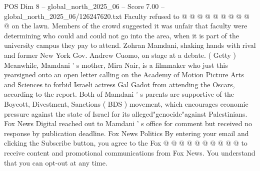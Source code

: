 \begin{textsample}{POS Dim 8 – global\_north\_2025\_06 – Score 7.00 – global\_north\_2025\_06/126247620.txt}
Faculty refused to @ @ @ @ @ @ @ @ @ @ on the lawn.
Members of the crowd suggested it was unfair that faculty were determining who could and could not go into the area, when it is part of the university campus they pay to attend.
Zohran Mamdani, shaking hands with rival and former New York Gov.
Andrew Cuomo, on stage at a debate. ( Getty ) Meanwhile, Mamdani ' s mother, Mira Nair, is a filmmaker who just this yearsigned onto an open letter calling on the Academy of Motion Picture Arts and Sciences to forbid Israeli actress Gal Gadot from attending the Oscars, according to the report.
Both of Mamdani ' s parents are supportive of the Boycott, Divestment, Sanctions ( BDS ) movement, which encourages economic pressure against the state of Israel for its alleged"genocide"against Palestinians.
Fox News Digital reached out to Mamdani ' s office for comment but received no response by publication deadline.
Fox News Politics By entering your email and clicking the Subscribe button, you agree to the Fox @ @ @ @ @ @ @ @ @ @ to receive content and promotional communications from Fox News.
You understand that you can opt-out at any time.

\end{textsample}

